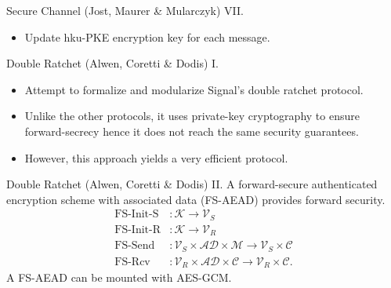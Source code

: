 \documentclass{beamer}
\renewcommand{\t}{\text}
\begin{document}
\begin{frame}{Secure Channel (Jost, Maurer \& Mularczyk) VII.}
  \scriptsize
  \begin{figure}[ht]
     \centering
     \setlength{\fboxsep}{10pt}
     \scalebox{0.55}{%
       \fbox{%
         
       }
     }
  \end{figure}
  \begin{itemize}
  \item Update hku-PKE encryption key for each message.
  \end{itemize}
\end{frame}

\begin{frame}{Double Ratchet (Alwen, Coretti \& Dodis) I.}
  \begin{itemize}
  \item Attempt to formalize and modularize Signal's double ratchet protocol.
  \item Unlike the other protocols, it uses private-key cryptography to ensure
    forward-secrecy hence it does not reach the same security guarantees.
  \item However, this approach yields a very efficient protocol.
  \end{itemize}
\end{frame}

\begin{frame}{Double Ratchet (Alwen, Coretti \& Dodis) II.}
  A forward-secure authenticated encryption scheme with associated data (FS-AEAD)
  provides forward security.
  \begin{align*}
    \t{FS-Init-S} & : \mathcal{K} \rightarrow \mathcal{V}_S \\
    \t{FS-Init-R} & : \mathcal{K} \rightarrow \mathcal{V}_R \\
    \t{FS-Send} & : \mathcal{V}_S \times \mathcal{AD} \times \mathcal{M}
                                \rightarrow \mathcal{V}_S \times \mathcal{C} \\
    \t{FS-Rcv} & : \mathcal{V}_R \times \mathcal{AD} \times \mathcal{C}
                                \rightarrow \mathcal{V}_R \times \mathcal{C}.
  \end{align*}
  A FS-AEAD can be mounted with AES-GCM.
\end{frame}
\end{document}
